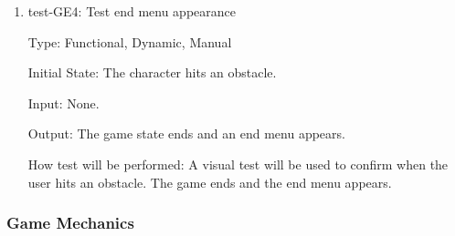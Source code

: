 \documentclass[12pt, titlepage]{article}
\begin{document}
\begin{enumerate}
\item{test-GE4: Test end menu appearance\\}

Type: Functional, Dynamic, Manual
					
Initial State: The character hits an obstacle.
					
Input: None.
					
Output: The game state ends and an end menu appears.
					
How test will be performed: A visual test will be used to confirm when the user hits an obstacle. The game ends and the end menu appears.

\end{enumerate}

\subsubsection{Game Mechanics}
\end{document}
